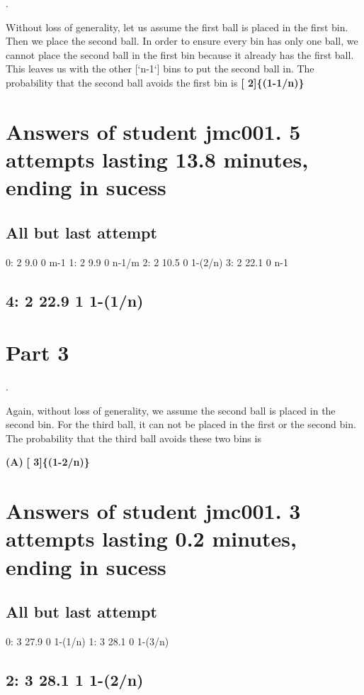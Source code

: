 \documentclass[11pt]{article}
\begin{document}
.

Without loss of generality, let us assume the first ball is placed in
the first bin. Then we place the second ball. In order to ensure every
bin has only one ball, we cannot place the second ball in the first
bin because it already has the first ball. This leaves us with the
other [`n-1`] bins to put the second ball in. The probability that the
second ball avoids the first bin is \textbf{[ 2]\{(1-1/n)\}}
\section{Answers of student jmc001.  5 attempts lasting 13.8 minutes, ending in sucess}
\label{sec-4}
\subsection{All but last attempt}
\label{sec-4-1}

  0:      2      9.0    0       m-1
  1:      2      9.9    0       n-1/m
  2:      2     10.5    0       1-(2/n)
  3:      2     22.1    0       n-1
\subsection{4:   2     22.9    1       1-(1/n)}
\label{sec-4-2}
\section{Part   3}
\label{sec-5}

.

Again, without loss of generality, we assume the second ball is placed
in the second bin. For the third ball, it can not be placed in the
first or the second bin. The probability that the third ball avoids
these two bins is

\textbf{(A)} \textbf{[  3]\{(1-2/n)\}}
\section{Answers of student jmc001.  3 attempts lasting 0.2 minutes, ending in sucess}
\label{sec-6}
\subsection{All but last attempt}
\label{sec-6-1}

  0:      3     27.9    0       1-(1/n)
  1:      3     28.1    0       1-(3/n)
\subsection{2:   3     28.1    1       1-(2/n)}
\label{sec-6-2}
\end{document}
